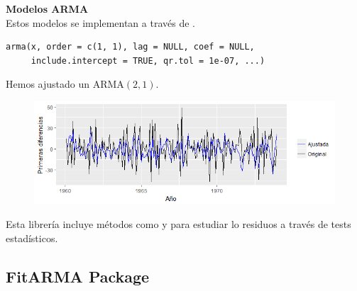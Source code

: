 \documentclass[10pt,a4paper,twoside]{beamer}
\begin{document}
\begin{frame}[fragile]
\textbf{Modelos ARMA}\\
Estos modelos se implementan a través de .

\begin{Verbatim}[fontsize=\footnotesize]
arma(x, order = c(1, 1), lag = NULL, coef = NULL,
     include.intercept = TRUE, qr.tol = 1e-07, ...)
\end{Verbatim}

Hemos ajustado un ARMA$(2,1)$.
\begin{figure}
    \centering
    \centerline{\includegraphics[scale = 0.6]{Images/3272.png}}
\end{figure}

Esta librería incluye métodos como  y  para estudiar lo residuos a través de tests estadísticos.

\end{frame}


\subsection{FitARMA Package}

\end{document}
